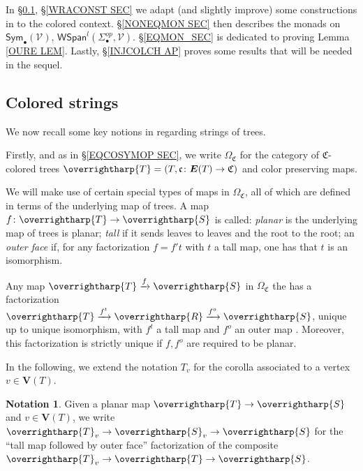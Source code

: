 \documentclass[a4paper,10pt
,draft
]{article}%
\numberwithin{equation}{section}
\numberwithin{figure}{section}
\theoremstyle{definition} %
\newtheorem{notation}[equation]{Notation}%
\newcommand{\vect}[1]{\text{\overrightharp{\ensuremath{#1}}}}
\newcommand{\V}{\ensuremath{\mathcal V}}
\newcommand{\1}{\ensuremath{\mathbbm 1}}%
\begin{document}
In \S \ref{CSTRINGS_SEC}, \S \ref{WRACONST SEC}
we adapt (and slightly improve) 
some constructions in \cite{BP_geo}
to the colored context.
%
\S \ref{NONEQMON SEC} then describes the monads on
$\mathsf{Sym}_{\bullet}(\V)$, $\mathsf{WSpan}^l(\Sigma_{\bullet}^{op},\mathcal{V})$.
%
\S \ref{EQMON_SEC} is dedicated to proving Lemma \ref{OURE LEM}.
Lastly,
\S \ref{INJCOLCH AP}
proves some results that 
{\color{red} will be needed in the sequel}.





\subsection{Colored strings}
\label{CSTRINGS_SEC}


We now recall some key notions in \cite{BP_geo}
regarding strings of trees.

Firstly, and as in \S \ref{EQCOSYMOP SEC},
we write 
$\Omega_{\mathfrak{C}}$
for the category of 
$\mathfrak{C}$-colored trees
$\vect{T} = (T,\mathfrak{c}\colon \boldsymbol{E}(T) \to \mathfrak{C})$
and color preserving maps.

We will make use of certain special types of maps in $\Omega_{\mathfrak{C}}$, all of which are defined in terms of the underlying map of trees.
A map $f \colon \vect{T} \to \vect{S}$
is called:
\emph{planar} is the underlying map of trees is planar;
\emph{tall} if it sends leaves to leaves and the root to the root;
an \emph{outer face}
if, for any factorization 
$f = f' t$ with $t$ a tall map, one has that $t$ is an isomorphism. 

Any map $\vect{T} \xrightarrow{f} \vect{S}$ in $\Omega_{\mathfrak{C}}$
the has a factorization
$\vect{T} \xrightarrow{f^t} \vect{R} \xrightarrow{f^o} \vect{S}$,
unique up to unique isomorphism,
with $f^t$ a tall map and $f^o$ an outer map
\cite[Prop. 3.36]{BP_geo}.
Moreover, this factorization is strictly unique if $f,f^o$ are required to be planar.

In the following,
we extend the notation $T_v$ for the corolla associated to a vertex 
$v \in \boldsymbol{V}(T)$.


\begin{notation}\label{SVNOT NOT}
	Given a planar map $\vect{T} \to \vect{S}$
	and $v \in \boldsymbol{V}(T)$,
	we write
	$\vect{T}_v \to \vect{S}_v \to \vect{S}$
	for the ``tall map followed by outer face''
	factorization of the composite
	$\vect{T}_v \to \vect{T} \to \vect{S}$.
\end{notation}
\end{document}
